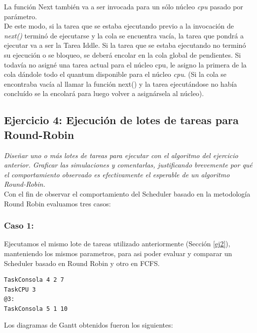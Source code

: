 \documentclass[a4paper]{article}
\begin{document}
La funci\'on Next tambi\'en va a ser invocada para un s\'olo n\'ucleo \emph{cpu} pasado por par\'ametro.\\
De este modo, si la tarea que se estaba ejecutando previo a la invocaci\'on de \emph{next()} termin\'o de ejecutarse y la cola se encuentra vac\'ia, la tarea que pondr\'a a ejecutar va a ser la Tarea Iddle.
Si la tarea que se estaba ejecutando no termin\'o su ejecuci\'on o se bloqueo, se deber\'a encolar en la cola global de pendientes.
Si todav\'ia no asign\'e una tarea actual para el n\'ucleo cpu, le asigno la primera de la cola d\'andole todo el quantum disponible para el n\'ucleo \emph{cpu}. (Si la cola se encontraba vac\'ia al llamar la funci\'on next() y la tarea ejecut\'andose no hab\'ia conclu\'ido se la encolar\'a para luego volver a asign\'arsela al n\'ucleo).\\
 
\bigskip 
 
 
 \subsection{Ejercicio 4: Ejecuci\'on de lotes de tareas para Round-Robin}
 
\textit{Dise\~nar uno o m\'as lotes de tareas para ejecutar con el algoritmo del ejercicio anterior. Graficar las simulaciones y comentarlas, justificando brevemente por qu\'e el comportamiento observado es efectivamente el esperable de un algoritmo Round-Robin.}\\


Con el fin de observar el comportamiento del Scheduler basado en la metodolog\'ia Round Robin evaluamos tres casos:

\subsubsection{Caso 1:}

Ejecutamos el mismo lote de tareas utilizado anteriormente (Secci\'on \ref{ej2}), manteniendo los mismos parametros, para asi poder evaluar y comparar un Scheduler basado en Round Robin y otro en FCFS. 

	\begin{codesnippet}
	\begin{verbatim}
TaskConsola 4 2 7
TaskCPU 3
@3:
TaskConsola 5 1 10
	\end{verbatim}
	\end{codesnippet}

Los diagramas de Gantt obtenidos fueron los siguientes:\\
\end{document}
